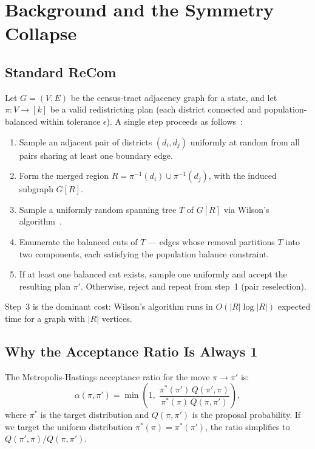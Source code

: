 \section{Background and the Symmetry Collapse}
\label{sec:background}

\subsection{Standard ReCom}

Let $G = (V, E)$ be the census-tract adjacency graph for a state, and let
$\pi : V \to [k]$ be a valid redistricting plan (each district connected
and population-balanced within tolerance $\epsilon$).
A single \recom{} step proceeds as follows~\citep{deford2021}:

\begin{enumerate}
  \item Sample an adjacent pair of districts $(d_i, d_j)$ uniformly at
        random from all pairs sharing at least one boundary edge.
  \item Form the merged region $R = \pi^{-1}(d_i) \cup \pi^{-1}(d_j)$,
        with the induced subgraph $G[R]$.
  \item Sample a uniformly random spanning tree $T$ of $G[R]$ via
        Wilson's algorithm~\citep{wilson1996}.
  \item Enumerate the balanced cuts of $T$ --- edges whose removal partitions
        $T$ into two components, each satisfying the population balance
        constraint.
  \item If at least one balanced cut exists, sample one uniformly and
        accept the resulting plan $\pi'$.
        Otherwise, reject and repeat from step~1 (pair reselection).
\end{enumerate}

Step~3 is the dominant cost: Wilson's algorithm runs in $O(|R| \log |R|)$
expected time for a graph with $|R|$ vertices.

\subsection{Why the Acceptance Ratio Is Always 1}

The Metropolis-Hastings acceptance ratio for the move $\pi \to \pi'$ is:
\[
  \alpha(\pi, \pi') = \min\!\left(1,\;
    \frac{\pi^*(\pi')\, Q(\pi', \pi)}{\pi^*(\pi)\, Q(\pi, \pi')}
  \right),
\]
where $\pi^*$ is the target distribution and $Q(\pi, \pi')$ is the proposal
probability.
If we target the uniform distribution $\pi^*(\pi) = \pi^*(\pi')$,
the ratio simplifies to $Q(\pi', \pi) / Q(\pi, \pi')$.

